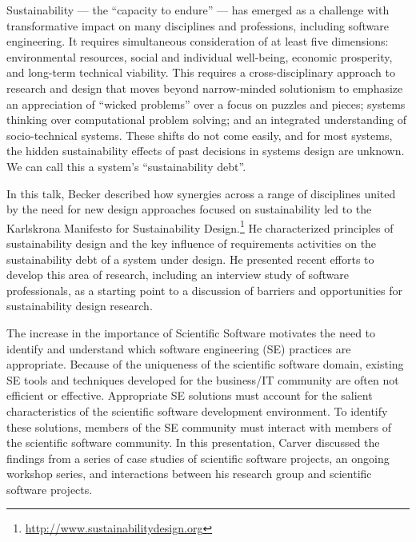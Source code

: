 \documentclass[a4paper,UKenglish]{dagrep}
\begin{document}
Sustainability --- the ``capacity to endure'' --- has emerged as a challenge with transformative impact on many disciplines and professions, including software engineering. It requires simultaneous consideration of at least five dimensions: environmental resources, social and individual well-being, economic prosperity, and long-term technical viability. This requires a cross-disciplinary approach to research and design that moves beyond narrow-minded solutionism to emphasize an appreciation of ``wicked problems'' over a focus on puzzles and pieces; systems thinking over computational problem solving; and an integrated understanding of socio-technical systems. These shifts do not come easily, and for most systems, the hidden sustainability effects of past decisions in systems design are unknown. We can call this a system's ``sustainability debt''.

In this talk, Becker described how synergies across a range of disciplines united by the need for new design approaches focused on sustainability led to the Karlskrona Manifesto for Sustainability Design.\footnote{\url{http://www.sustainabilitydesign.org}}
He characterized principles of sustainability design and the key influence of requirements activities on the sustainability debt of a system under design. He presented recent efforts to develop this area of research, including an interview study of software professionals, as a starting point to a discussion of barriers and opportunities for sustainability design research.


The increase in the importance of Scientific Software motivates the need to identify and understand which software engineering (SE) practices are appropriate. Because of the uniqueness of the scientific software domain, existing SE tools and techniques developed for the business/IT community are often not efficient or effective. Appropriate SE solutions must account for the salient characteristics of the scientific software development environment. To identify these solutions, members of the SE community must interact with members of the scientific software community. In this presentation, Carver discussed the findings from a series of case studies of scientific software projects, an ongoing workshop series, and interactions between his research group and scientific software projects.
\end{document}
